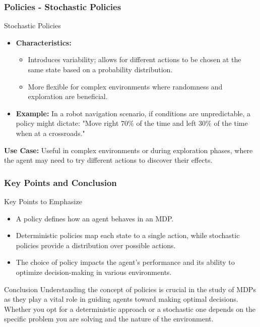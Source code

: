 \documentclass{beamer}
\begin{document}
\begin{frame}[fragile]
    \frametitle{Policies - Stochastic Policies}
    \begin{block}{Stochastic Policies}
        \begin{itemize}
            \item \textbf{Characteristics:}
                \begin{itemize}
                    \item Introduces variability; allows for different actions to be chosen at the same state based on a probability distribution.
                    \item More flexible for complex environments where randomness and exploration are beneficial.
                \end{itemize}
            \item \textbf{Example:} In a robot navigation scenario, if conditions are unpredictable, a policy might dictate: "Move right 70\% of the time and left 30\% of the time when at a crossroads."
        \end{itemize}
        
        \textbf{Use Case:} Useful in complex environments or during exploration phases, where the agent may need to try different actions to discover their effects.
    \end{block}
\end{frame}

\begin{frame}[fragile]
    \frametitle{Key Points and Conclusion}
    \begin{block}{Key Points to Emphasize}
        \begin{itemize}
            \item A policy defines how an agent behaves in an MDP.
            \item Deterministic policies map each state to a single action, while stochastic policies provide a distribution over possible actions.
            \item The choice of policy impacts the agent’s performance and its ability to optimize decision-making in various environments.
        \end{itemize}
    \end{block}
    
    \begin{block}{Conclusion}
        Understanding the concept of policies is crucial in the study of MDPs as they play a vital role in guiding agents toward making optimal decisions. Whether you opt for a deterministic approach or a stochastic one depends on the specific problem you are solving and the nature of the environment.
    \end{block}
\end{frame}
\end{document}
